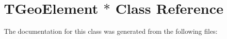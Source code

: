 \hypertarget{class_t_geo_element_01_5}{
\section{TGeoElement $\ast$ Class Reference}
\label{class_t_geo_element_01_5}
}


The documentation for this class was generated from the following files: